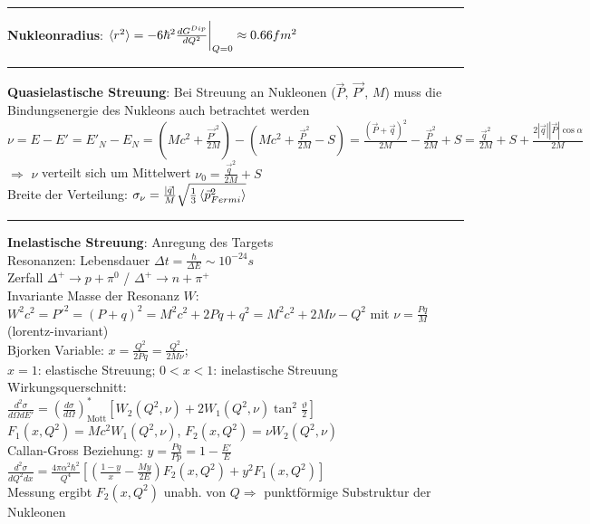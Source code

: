 \documentclass[10pt,twoside,a4paper]{article}
\begin{document}
\begin{multicols*}{3}
\\ \rule[0ex]{\columnwidth}{0.5pt}
\textbf{Nukleonradius}: $\braket{r^2} = -6 \hbar^2 \frac{dG^{Dip}}{dQ^2}\bigg|_{Q=0} \approx 0.66 fm^2$
\\ \rule[0ex]{\columnwidth}{0.5pt}
\textbf{Quasielastische Streuung}: Bei Streuung an Nukleonen ($\vec{P}$, $\vec{P'}$, $M$) muss die Bindungsenergie des Nukleons auch betrachtet werden \\
$\nu = E - E' = E'_N - E_N = (M c^2 + \frac{\vec{P'}^2}{2 M}) - (M c^2 + \frac{\vec{P}^2}{2 M} - S) = \frac{(\vec{P} + \vec{q})^2}{2 M} - \frac{\vec{P}^2}{2 M} + S = \frac{\vec{q}^2}{2 M} + S + \frac{2 |\vec{q}| |\vec{P}| \cos \alpha}{2 M}$ \\
$\Rightarrow$ $\nu$ verteilt sich um Mittelwert $\nu_0 = \frac{\vec{q}^2}{2 M} + S$ \\
Breite der Verteilung: $\sigma_{\nu} = \frac{|\vec{q}|}{M} \sqrt{\frac{1}{3} \braket{\vec{p}^2_{Fermi}}}$
\\ \rule[0ex]{\columnwidth}{0.5pt}
\textbf{Inelastische Streuung}: Anregung des Targets \\
Resonanzen: Lebensdauer $\Delta t = \frac{\hbar}{\Delta E} \sim 10^{-24} s$ \\
Zerfall $\Delta^+ \to p + \pi^0$ / $\Delta^+ \to n + \pi^+$ \\
Invariante Masse der Resonanz $W$: $W^2 c^2 = P'^2 = (P + q)^2 = M^2 c^2 + 2 P q + q^2 = M^2 c^2 + 2 M \nu - Q^2$ mit $\nu = \frac{P q}{M}$ (lorentz-invariant) \\
Bjorken Variable: $x=\frac{Q^2}{2 P q} = \frac{Q^2}{2 M \nu}$; \\
$x=1$: elastische Streuung; $0<x<1$: inelastische Streuung \\
Wirkungsquerschnitt: \\
$\frac{d^2 \sigma}{d\Omega dE'} = \left( \frac{d\sigma}{d\Omega} \right)^*_{\text{Mott}} \left[ W_2(Q^2, \nu) + 2 W_1(Q^2, \nu) \tan^2 \frac{\vartheta}{2} \right]$ \\
$F_1(x,Q^2) = M c^2 W_1(Q^2, \nu)$, $F_2(x,Q^2) = \nu W_2(Q^2, \nu)$ \\
Callan-Gross Beziehung: $y = \frac{P q}{P p} = 1 - \frac{E'}{E}$ \\
$\scriptscriptstyle\frac{d^2\sigma}{dQ^2 dx} = \frac{4 \pi \alpha^2 \hbar^2}{Q^4} \left[ \left( \frac{1-y}{x} - \frac{M y}{2 E} \right) F_2(x,Q^2) + y^2 F_1(x,Q^2) \right]$ \\
Messung ergibt $F_2(x,Q^2)$ unabh. von $Q \Rightarrow$ punktförmige Substruktur der Nukleonen \\

\end{multicols*}
\end{document}
